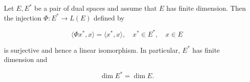 Let $E, E^*$ be a pair of dual spaces and assume that $E$ has finite dimension. Then the injection $\Phi: E^* \rightarrow L(E)$ defined by

$$\langle \Phi x^*, x \rangle = \langle x^*, x \rangle, \quad x^* \in E^*, \quad x \in E$$

is surjective and hence a linear isomorphism. In particular, $E^*$ has finite dimension and

$$\dim E^* = \dim E.$$
